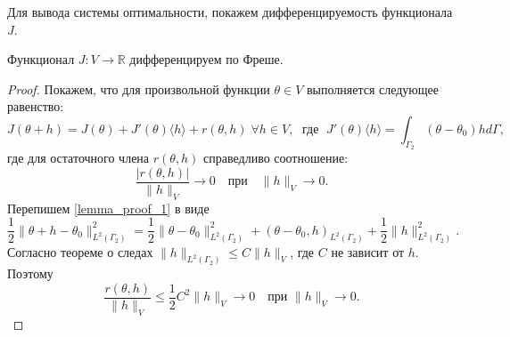 \documentclass[10pt]{article}
\begin{document}
    Для вывода системы оптимальности, покажем дифференцируемость функционала $J$.
    \begin{lem}
        \label{freshet_diff}
        Функционал $J : V \rightarrow \mathbb{R}$ дифференцируем по Фреше.
    \end{lem}
    \begin{proof}
        Покажем, что для произвольной функции $\theta \in V$ выполняется следующее равенство:
        \begin{equation}
            \label{lemma_proof_1}
            J(\theta + h) = J(\theta) + J'(\theta)\langle h \rangle + r(\theta, h) \; \forall h \in V, \; \text{ где } \; J'(\theta)\langle h \rangle = \int_{\Gamma_2} (\theta - \theta_0)h d\Gamma,
        \end{equation}
        где для остаточного члена $r(\theta,h)$ справедливо соотношение:
        \begin{equation}
            \label{lemma_proof_2} \frac{|r(\theta,h)|}{\|h\|_V} \rightarrow 0 \quad \text{при} \quad \|h\|_V \rightarrow 0.
        \end{equation}
        Перепишем \eqref{lemma_proof_1} в виде
        $$
        \frac{1}{2} \|\theta + h - \theta_0\|^2_{L^2(\Gamma_2)} =
        \frac{1}{2} \| \theta - \theta_0 \|^2_{L^2(\Gamma_2)} +
        (\theta - \theta_0, h)_{L^2(\Gamma_2)} +
        \frac{1}{2}\| h \|^2_{L^2(\Gamma_2)}.
        $$
        Согласно теореме о следах $ \|h\|_{L^2(\Gamma_2)} \le C \|h\|_V $, где $C$ не зависит от $h$. Поэтому
        $$
        \frac{r(\theta,h)}{\| h \|_V} \leq
        \frac{1}{2} C^2 \| h \|_V \rightarrow 0 \quad \text{при } \| h \|_V \rightarrow 0.
        $$
    \end{proof}
\end{document}
